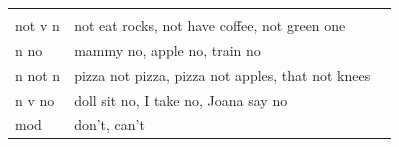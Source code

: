 \documentclass[man]{apa6}
\begin{document}
\begin{longtable}[]{@{}lll@{}}
\begin{minipage}[t]{0.27\columnwidth}
\strut
\end{minipage}\tabularnewline
\begin{minipage}[t]{0.21\columnwidth}\raggedright\strut
not v n\strut
\end{minipage} & \begin{minipage}[t]{0.43\columnwidth}\raggedright\strut
not eat rocks, not have coffee, not green one\strut
\end{minipage} & \begin{minipage}[t]{0.27\columnwidth}\raggedright\strut
\strut
\end{minipage}\tabularnewline
\begin{minipage}[t]{0.21\columnwidth}\raggedright\strut
n no\strut
\end{minipage} & \begin{minipage}[t]{0.43\columnwidth}\raggedright\strut
mammy no, apple no, train no\strut
\end{minipage} & \begin{minipage}[t]{0.27\columnwidth}\raggedright\strut
\strut
\end{minipage}\tabularnewline
\begin{minipage}[t]{0.21\columnwidth}\raggedright\strut
n not n\strut
\end{minipage} & \begin{minipage}[t]{0.43\columnwidth}\raggedright\strut
pizza not pizza, pizza not apples, that not knees\strut
\end{minipage} & \begin{minipage}[t]{0.27\columnwidth}\raggedright\strut
\strut
\end{minipage}\tabularnewline
\begin{minipage}[t]{0.21\columnwidth}\raggedright\strut
n v no\strut
\end{minipage} & \begin{minipage}[t]{0.43\columnwidth}\raggedright\strut
doll sit no, I take no, Joana say no\strut
\end{minipage} & \begin{minipage}[t]{0.27\columnwidth}\raggedright\strut
\strut
\end{minipage}\tabularnewline
\begin{minipage}[t]{0.21\columnwidth}\raggedright\strut
mod\strut
\end{minipage} & \begin{minipage}[t]{0.43\columnwidth}\raggedright\strut
don't, can't\strut
\end{minipage} & \begin{minipage}[t]{0.27\columnwidth}\raggedright\strut

\end{minipage}
\end{longtable}
\end{document}
